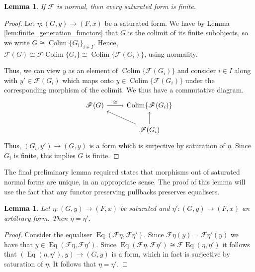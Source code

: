 \documentclass[12pt]{article}
\theoremstyle{plain}
\newtheorem{lemma}[thm]{Lemma}
\theoremstyle{definition}
\newcommand{\scr}[1]{\mathscr{#1}}
\newcommand{\lto}{\longrightarrow}
\begin{document}
	\begin{lemma}
		If $\scr{F}$ is normal, then every saturated form is finite.
		\end{lemma}
	\begin{proof}
		Let $\eta: (G, y) \lto (F,x)$ be a saturated form. We have by Lemma \ref{lem:finite_generation_functors} that $G$ is the colimit of its finite subobjects, so we write $G \cong \operatorname{Colim}\{ G_i \}_{i \in I}$. Hence, $\scr{F}(G) \cong \scr{F} \operatorname{Colim}\{ G_i \} \cong \operatorname{Colim}\{ \scr{F}(G_i) \}$, using normality.
		
		Thus, we can view $y$ as an element of $\operatorname{Colim}\{ \scr{F}(G_i) \}$ and consider $i \in I$ along with $y' \in \scr{F}(G_i)$ which maps onto $y \in \operatorname{Colim}\{ \scr{F}(G_i) \}$ under the corresponding morphism of the colimit. We thus have a commutative diagram.
		\begin{equation}
			\begin{tikzcd}
				\scr{F}(G)\arrow[r,"{\cong}"] & \operatorname{Colim}\{ \scr{F}(G_i) \}\\
				& \scr{F} (G_i)\arrow[u]\arrow[ul]
				\end{tikzcd}
			\end{equation}
		Thus, $(G_i, y') \lto (G,y)$ is a form which is surjective by saturation of $\eta$. Since $G_i$ is finite, this implies $G$ is finite.
		\end{proof}
	The final preliminary lemma required states that morphisms out of saturated normal forms are unique, in an appropriate sense. The proof of this lemma will use the fact that any functor preserving pullbacks preserves equalisers.
	\begin{lemma}\label{lem:saturated_unique}
		Let $\eta: (G,y) \lto (F,x)$ be saturated and $\eta': (G,y) \lto (F,x)$ an arbitrary form. Then $\eta = \eta'$.
		\end{lemma}
	\begin{proof}
		Consider the equaliser $\operatorname{Eq}(\scr{F}\eta, \scr{F}\eta')$. Since $\scr{F}\eta(y) = \scr{F}\eta'(y)$ we have that $y \in \operatorname{Eq}(\scr{F}\eta, \scr{F}\eta')$. Since $\operatorname{Eq}(\scr{F}\eta, \scr{F}\eta') \cong \scr{F}\operatorname{Eq}(\eta,\eta')$ it follows that $(\operatorname{Eq}(\eta,\eta'), y) \lto (G,y)$ is a form, which in fact is surjective by saturation of $\eta$. It follows that $\eta = \eta'$.
		\end{proof}
	
\end{document}
